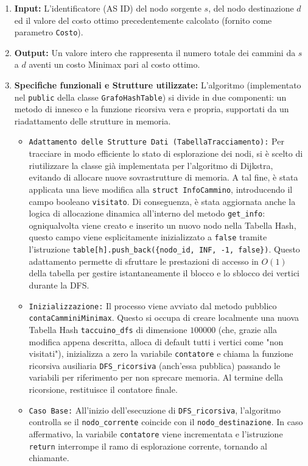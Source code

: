 \documentclass[12pt, a4paper]{article}
\begin{document}
\begin{enumerate}
    \item \textbf{Input:} L'identificatore (AS ID) del nodo sorgente $s$, del nodo destinazione $d$ ed il valore del costo ottimo precedentemente calcolato (fornito come parametro \texttt{Costo}).
    \item \textbf{Output:} Un valore intero che rappresenta il numero totale dei cammini da $s$ a $d$ aventi un costo Minimax pari al costo ottimo.
    \item \textbf{Specifiche funzionali e Strutture utilizzate:} L'algoritmo (implementato nel \texttt{public} della classe \texttt{GrafoHashTable}) si divide in due componenti: un metodo di innesco e la funzione ricorsiva vera e propria, supportati da un riadattamento delle strutture in memoria.
\begin{itemize}
    \item[-] \texttt{Adattamento delle Strutture Dati (\texttt{TabellaTracciamento}):} Per tracciare in modo efficiente lo stato di esplorazione dei nodi, si è scelto di riutilizzare la classe già implementata per l'algoritmo di Dijkstra, evitando di allocare nuove sovrastrutture di memoria. A tal fine, è stata applicata una lieve modifica alla \texttt{struct InfoCammino}, introducendo il campo booleano \texttt{visitato}. Di conseguenza, è stata aggiornata anche la logica di allocazione dinamica all'interno del metodo \texttt{get\_info}: ogniqualvolta viene creato e inserito un nuovo nodo nella Tabella Hash, questo campo viene esplicitamente inizializzato a \texttt{false} tramite l'istruzione \texttt{table[h].push\_back(\{nodo\_id, INF, -1, false\})}. Questo adattamento permette di sfruttare le prestazioni di accesso in $O(1)$ della tabella per gestire istantaneamente il blocco e lo sblocco dei vertici durante la DFS.
    \item[-] \texttt{Inizializzazione:} Il processo viene avviato dal metodo pubblico \texttt{contaCamminiMinimax}. Questo si occupa di creare localmente una nuova Tabella Hash \texttt{taccuino\_dfs} di dimensione $100000$ (che, grazie alla modifica appena descritta, alloca di default tutti i vertici come "non visitati"), inizializza a zero la variabile \texttt{contatore} e chiama la funzione ricorsiva ausiliaria \texttt{DFS\_ricorsiva} (anch'essa pubblica) passando le variabili per riferimento per non sprecare memoria. Al termine della ricorsione, restituisce il contatore finale.
    \item[-] \texttt{Caso Base:} All'inizio dell'esecuzione di \texttt{DFS\_ricorsiva}, l'algoritmo controlla se il \texttt{nodo\_corrente} coincide con il \texttt{nodo\_destinazione}. In caso affermativo, la variabile \texttt{contatore} viene incrementata e l'istruzione \texttt{return} interrompe il ramo di esplorazione corrente, tornando al chiamante.

\end{itemize}
\end{enumerate}
\end{document}
